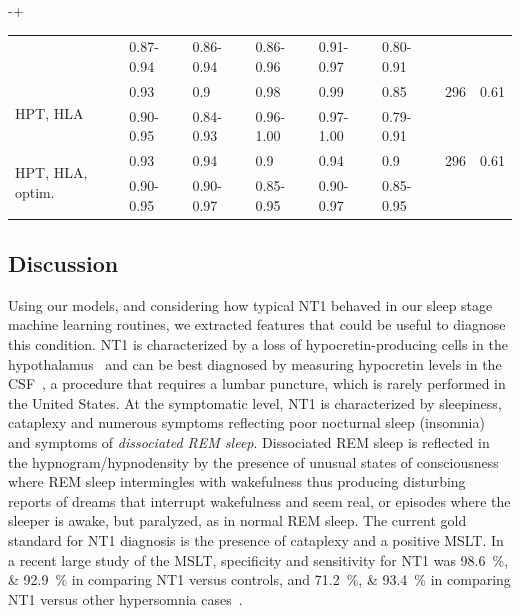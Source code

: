 \begin{table}
\begin{adjustwidth*}{}{-\marginparwidth+\marginparsep}
\begin{tabular}{@{}llllllrr@{}}
                            & 0.87-0.94     & 0.86-0.94        & 0.86-0.96        & 0.91-0.97 & 0.80-0.91 &           &                            \\
        \multirow[t]{2}{0.15\textwidth}{HPT, HLA}            & 0.93          & 0.9              & 0.98             & 0.99      & 0.85      & 296       & 0.61                       \\
                            & 0.90-0.95     & 0.84-0.93        & 0.96-1.00        & 0.97-1.00 & 0.79-0.91 &           &                            \\
        \multirow[t]{2}{0.15\textwidth}{HPT, HLA, optim.}    & 0.93          & 0.94             & 0.9              & 0.94      & 0.9       & 296       & 0.61                       \\
                            & 0.90-0.95     & 0.90-0.97        & 0.85-0.95        & 0.90-0.97 & 0.85-0.95 &           &                            \\ \bottomrule
    \end{tabular}
    \end{adjustwidth*}
\end{table}

\subsection{Discussion}

Using our models, and considering how typical \ac{NT1} behaved in our sleep stage machine learning routines, we extracted features that could be useful to diagnose this condition.
\Ac{NT1} is characterized by a loss of hypocretin-producing cells in the hypothalamus~\cite{Peyron2000} and can be best diagnosed by measuring hypocretin levels in the \ac{CSF}~\cite{Mignot2002}, a procedure that requires a lumbar puncture, which is rarely performed in the United States.
At the symptomatic level, \ac{NT1} is characterized by sleepiness, cataplexy and numerous symptoms reflecting poor nocturnal sleep (insomnia) and symptoms of \textit{dissociated REM sleep}.
Dissociated \ac{REM} sleep is reflected in the hypnogram/hypnodensity by the presence of unusual states of consciousness where \ac{REM} sleep intermingles with wakefulness thus producing disturbing reports of dreams that interrupt wakefulness and seem real, or episodes where the sleeper is awake, but paralyzed, as in normal REM sleep.
The current gold standard for \ac{NT1} diagnosis is the presence of cataplexy and a positive \ac{MSLT}.
In a recent large study of the \ac{MSLT}, specificity and sensitivity for \ac{NT1} was \SIlist{98.6;92.9}{\percent} in comparing \ac{NT1} versus controls, and \SIlist{71.2;93.4}{\percent} in comparing \ac{NT1} versus other hypersomnia cases~\cite{Andlauer2013}.

